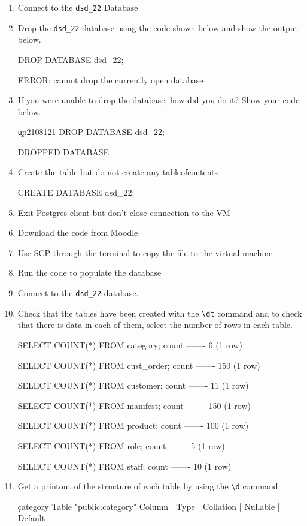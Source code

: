 \begin{enumerate}
\item Connect to the \texttt{dsd\_22} Database
\item Drop the \texttt{dsd\_22} database using the code shown below and show the output below.
\begin{sql}
DROP DATABASE dsd_22;
\end{sql}
\begin{pseudo*}
ERROR:  cannot drop the currently open database
\end{pseudo*}
\item If you were unable to drop the database, how did you do it? Show your code below.
\begin{sql}
\c up2108121
DROP DATABASE dsd_22;
\end{sql}
\begin{pseudo*}
DROPPED DATABASE
\end{pseudo*}
\item Create the table but do not create any tableofcontents
\begin{sql}
CREATE DATABASE dsd_22;
\end{sql}
\item Exit Postgres client but don't close connection to the VM
\item Download the code from Moodle
\item Use SCP through the terminal to copy the file to the virtual machine
\item Run the code to populate the database
\item Connect to the \texttt{dsd\_22} database.
\item Check that the tables have been created with the \verb|\dt| command and to check that there is data in each of them, select the number of rows in each table.
\begin{pseudo*}
SELECT COUNT(*) FROM category;
 count
-------
     6
(1 row)

SELECT COUNT(*) FROM cust_order;
 count
-------
   150
(1 row)

SELECT COUNT(*) FROM customer;
 count
-------
    11
(1 row)

SELECT COUNT(*) FROM manifest;
 count
-------
   150
(1 row)

SELECT COUNT(*) FROM product;
 count
-------
   100
(1 row)

SELECT COUNT(*) FROM role;
 count
-------
     5
(1 row)

SELECT COUNT(*) FROM staff;
 count
-------
    10
(1 row)
\end{pseudo*}
\item Get a printout of the structure of each table by using the \verb|\d| command.
\begin{pseudo*}
\d category
    Table "public.category"
Column  |         Type          | Collation | Nullable |                 Default              


\end{pseudo*}
\end{enumerate}
